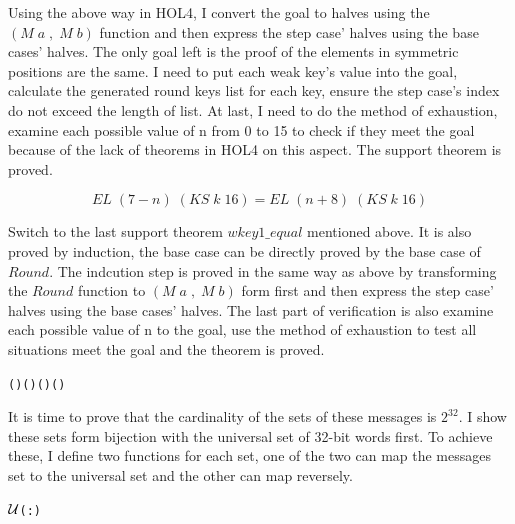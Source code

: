 \documentclass{article}
\begin{document}
Using the above way in HOL4, I convert the goal to halves using the $(M\;a\;,\;M\;b)$ function and then
express the step case' halves using the base cases' halves. The only goal left is the proof of the elements in
symmetric positions are the same. I need to put each weak key's value into the goal, calculate the generated
round keys list for each key, ensure the step case's index do not exceed the length of list. At last, I need to
do the method of exhaustion, examine each possible value of n from 0 to 15 to check if they meet the goal because of
the lack of theorems in HOL4 on this aspect. The support theorem is proved.

\begin{equation*}
EL \; (7-n) \; (KS \; k \; 16) = EL \; (n+8) \; (KS \; k \; 16)
\end{equation*}

Switch to the last support theorem $wkey1\_equal$ mentioned above. It is also proved by induction, the base case can
be directly proved by the base case of $Round$. The indcution step is proved in the same way as above by transforming
the $Round$ function to $(M\;a\;,\;M\;b)$ form first and then express the step case' halves using the base cases' halves.
The last part of verification is also examine each possible value of n to the goal, use the method of exhaustion to
test all situations meet the goal and the theorem is proved.

\begin{alltt}
   \HOLTokenTurnstile{}    \HOLSymConst{\HOLTokenConj{}}  \HOLSymConst{\HOLTokenLeq{}}  \HOLSymConst{\HOLTokenImp{}}
     (  ) ( ) \HOLSymConst{=}   (  ) ( )
\end{alltt}

It is time to prove that the cardinality of the sets of these messages is $2^{32}$. I show these sets form bijection with
the universal set of 32-bit words first. To achieve these, I define two functions for each set, one of the two can map the messages
set to the universal set and the other can map reversely.

\begin{alltt}
   \HOLTokenTurnstile{}    \ensuremath{{\cal{U}}}(:)
\end{alltt}
\end{document}
